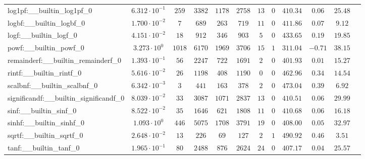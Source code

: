 \begin{tabular}{|l|c|c|c|c|c|c|c|c|c|c|c|}
log1pf:\_\_builtin\_log1pf\_0             & $ 6.312 \cdot 10^{-1} $ & $ 259    $ & $ 3382  $ & $ 1178  $ & $ 2758  $ & $ 13  $ & $ 0 $ & $ 410.34      $ & $ 0.06    $ & $ 25.48   $ \\
logbf:\_\_builtin\_logbf\_0               & $ 1.700 \cdot 10^{-2} $ & $ 7      $ & $ 689   $ & $ 263   $ & $ 719   $ & $ 11  $ & $ 0 $ & $ 411.86      $ & $ 0.07    $ & $ 9.12    $ \\
logf:\_\_builtin\_logf\_0                 & $ 4.151 \cdot 10^{-2} $ & $ 18     $ & $ 912   $ & $ 346   $ & $ 903   $ & $ 5   $ & $ 0 $ & $ 433.65      $ & $ 0.19    $ & $ 19.85   $ \\
powf:\_\_builtin\_powf\_0                 & $ 3.273 \cdot 10^{0}  $ & $ 1018   $ & $ 6170  $ & $ 1969  $ & $ 3706  $ & $ 15  $ & $ 1 $ & $ 311.04      $ & $ -0.71   $ & $ 38.15   $ \\
remainderf:\_\_builtin\_remainderf\_0     & $ 1.393 \cdot 10^{-1} $ & $ 56     $ & $ 2247  $ & $ 722   $ & $ 1691  $ & $ 2   $ & $ 0 $ & $ 401.93      $ & $ 0.01    $ & $ 15.27   $ \\
rintf:\_\_builtin\_rintf\_0               & $ 5.616 \cdot 10^{-2} $ & $ 26     $ & $ 1198  $ & $ 408   $ & $ 1190  $ & $ 0   $ & $ 0 $ & $ 462.96      $ & $ 0.34    $ & $ 14.54   $ \\
scalbnf:\_\_builtin\_scalbnf\_0           & $ 6.342 \cdot 10^{-3} $ & $ 3      $ & $ 441   $ & $ 163   $ & $ 378   $ & $ 2   $ & $ 0 $ & $ 473.04      $ & $ 0.39    $ & $ 6.92    $ \\
significandf:\_\_builtin\_significandf\_0 & $ 8.039 \cdot 10^{-2} $ & $ 33     $ & $ 3087  $ & $ 1071  $ & $ 2837  $ & $ 13  $ & $ 0 $ & $ 410.51      $ & $ 0.06    $ & $ 29.99   $ \\
sinf:\_\_builtin\_sinf\_0                 & $ 8.522 \cdot 10^{-2} $ & $ 35     $ & $ 1646  $ & $ 621   $ & $ 1808  $ & $ 11  $ & $ 0 $ & $ 410.68      $ & $ 0.06    $ & $ 16.18   $ \\
sinhf:\_\_builtin\_sinhf\_0               & $ 1.093 \cdot 10^{0}  $ & $ 446    $ & $ 5075  $ & $ 1708  $ & $ 3791  $ & $ 19  $ & $ 0 $ & $ 408.00      $ & $ 0.05    $ & $ 32.97   $ \\
sqrtf:\_\_builtin\_sqrtf\_0               & $ 2.648 \cdot 10^{-2} $ & $ 13     $ & $ 226   $ & $ 69    $ & $ 127   $ & $ 2   $ & $ 1 $ & $ 490.92      $ & $ 0.46    $ & $ 3.51    $ \\
tanf:\_\_builtin\_tanf\_0                 & $ 1.965 \cdot 10^{-1} $ & $ 80     $ & $ 2488  $ & $ 876   $ & $ 2624  $ & $ 24  $ & $ 0 $ & $ 407.17      $ & $ 0.04    $ & $ 25.57   $ \\

\end{tabular}
